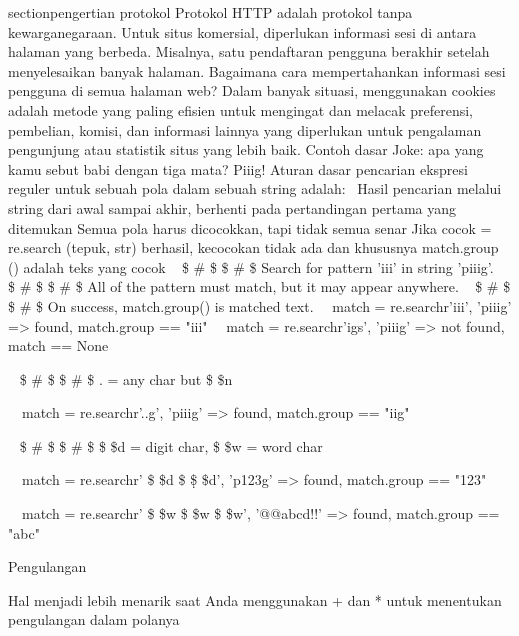 \begin{12pt}
\begin{12pt}
\begin{12pt}
\begin{12pt}
\begin{12pt}
section{pengertian protokol}
Protokol HTTP adalah protokol tanpa kewarganegaraan. Untuk situs komersial, diperlukan informasi sesi di antara halaman yang berbeda. Misalnya, satu pendaftaran pengguna berakhir setelah menyelesaikan banyak halaman. Bagaimana cara mempertahankan informasi sesi pengguna di semua halaman web? Dalam banyak situasi, menggunakan cookies adalah metode yang paling efisien untuk mengingat dan melacak preferensi, pembelian, komisi, dan informasi lainnya yang diperlukan untuk pengalaman pengunjung atau statistik situs yang lebih baik. 
Contoh dasar 
Joke: apa yang kamu sebut babi dengan tiga mata? Piiig! 
Aturan dasar pencarian ekspresi reguler untuk sebuah pola dalam sebuah string adalah: \
Hasil pencarian melalui string dari awal sampai akhir, berhenti pada pertandingan pertama yang ditemukan  Semua pola harus dicocokkan, tapi tidak semua senar Jika cocok = re.search (tepuk, str) berhasil, kecocokan tidak ada dan khususnya match.group () adalah teks yang cocok
~  \$  \#  \$ \$  \#  \$ Search for pattern 'iii' in string 'piiig'. 
~  \$  \#  \$ \$  \#  \$ All of the pattern must match, but it may appear anywhere. 
~  \$  \#  \$ \$  \#  \$ On success, match.group() is matched text. 
~~match = re.search{r'iii', 'piiig'} =>  found, match.group{} == "iii" 
\noindent 
~~match = re.search{r'igs', 'piiig'} =>  not found, match == None \par
\vspace{12pt}
\noindent 
~  \$  \#  \$ \$  \#  \$ . = any char but  \$  \setminus  \$n \par
\noindent 
~~match = re.search{r'..g', 'piiig'} =>  found, match.group == "iig" \par
\vspace{12pt}
\noindent 
~  \$  \#  \$ \$  \#  \$  \$  \setminus  \$d = digit char,  \$  \setminus  \$w = word char \par
\noindent 
~~match = re.search{r' \$  \setminus  \$d \$  \setminus  \d \$  \setminus  \$d', 'p123g'} =>  found, match.group{} == "123" \par
\noindent 
~~match = re.search{r' \$  \setminus  \$w \$  \setminus  \$w \$  \setminus  \$w', '@@abcd!!'} =>  found, match.group{} == "abc" \par
\begin{12pt}
\vspace{12pt}
\noindent 
Pengulangan \par
\vspace{12pt}
\noindent 
Hal menjadi lebih menarik saat Anda menggunakan + dan * untuk menentukan pengulangan dalam polanya \par

\end{12pt}
\end{12pt}
\end{12pt}
\end{12pt}
\end{12pt}
\end{12pt}

